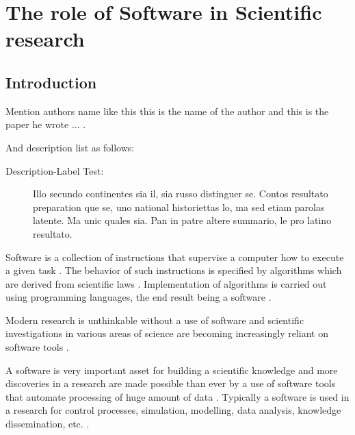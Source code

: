\chapter{The role of Software in Scientific research}
\label{ch:Roles}

%

\section{Introduction}
\label{sec:background:intro}
Mention authors name like this  this is the name of the author  \citeauthor{bentley:1999}  and this is the paper he wrote\citep{bentley:1999}  ... .

And description list as follows:
\begin{description}
  \item[Description-Label Test:] Illo secundo continentes sia il, sia russo distinguer se. Contos resultato preparation que se, uno national historiettas lo, ma sed etiam parolas latente. Ma unic quales sia. Pan in patre altere summario, le pro latino resultato.
\end{description}


Software is a collection of instructions that supervise a computer how to execute a given task \citep{enwiki:1056292826}. The behavior of such instructions is specified by algorithms which are derived from scientific laws \citep{wolfram1984computer}.  Implementation of algorithms is carried out using programming languages, the end result being a software \citep{enwiki:1055624679, enwiki:1055665216}. 

Modern research is unthinkable without a use of software and scientific investigations in various areas of science are becoming increasingly reliant on software tools \citep{goble2014better, wilson2014best, storer2017bridging}.

A software is very important asset for building a scientific knowledge and more discoveries in a research are made possible than ever by a use of software tools that automate processing of huge amount of data \citep{jimenez2017four}. Typically a software is used in a research for control processes, simulation, modelling, data analysis, knowledge dissemination, etc. \cite{hannay2009scientists, pan2016disciplinary}.

